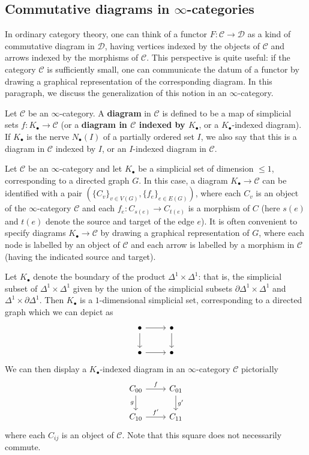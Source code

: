 \subsection{Commutative diagrams in \texorpdfstring{$\infty$}{inf}-categories}
In ordinary category theory, one can think of a functor $F:\mathcal{C}\to\mathcal{D}$ as a kind of commutative diagram in $\mathcal{D}$, having vertices indexed by the objects of $\mathcal{C}$ and arrows indexed by the morphisms of $\mathcal{C}$. This perspective is quite useful: if the category $\mathcal{C}$ is sufficiently small, one can communicate the datum of a functor by drawing a graphical representation of the corresponding diagram. In this paragraph, we discuss the generalization of this notion in an $\infty$-category.\par
Let $\mathcal{C}$ be an $\infty$-category. A \textbf{diagram} in $\mathcal{C}$ is defined to be a map of simplicial sets $f:K_\bullet\to\mathcal{C}$ (or a \textbf{diagram in $\mathcal{C}$ indexed by $K_\bullet$}, or a $K_\bullet$-indexed diagram). If $K_\bullet$ is the nerve $N_\bullet(I)$ of a partially ordered set $I$, we also say that this is a diagram in $\mathcal{C}$ indexed by $I$, or an $I$-indexed diagram in $\mathcal{C}$.
\begin{example}\label{simplicial set diagram indexed by graph}
Let $\mathcal{C}$ be an $\infty$-category and let $K_\bullet$ be a simplicial set of dimension $\leq 1$, corresponding to a directed graph $G$. In this case, a diagram $K_\bullet\to\mathcal{C}$ can be identified with a pair $(\{C_v\}_{v\in V(G)},\{f_e\}_{e\in E(G)})$, where each $C_v$ is an object of the $\infty$-category $\mathcal{C}$ and each $f_e:C_{s(e)}\to C_{t(e)}$ is a morphism of $C$ (here $s(e)$ and $t(e)$ denote the source and target of the edge $e$). It is often convenient to specify diagrams $K_\bullet\to\mathcal{C}$ by drawing a graphical representation of $G$, where each node is labelled by an object of $\mathcal{C}$ and each arrow is labelled by a morphism in $\mathcal{C}$ (having the indicated source and target).
\end{example}
\begin{example}\label{simplicial set non-commutative square in cat}
Let $K_\bullet$ denote the boundary of the product $\Delta^1\times\Delta^1$: that is, the simplicial subset of $\Delta^1\times\Delta^1$ given by the union of the simplicial subsets $\partial\Delta^1\times\Delta^1$ and $\Delta^1\times\partial\Delta^1$. Then $K_\bullet$ is a $1$-dimensional simplicial set, corresponding to a directed graph which we can depict as
\[\begin{tikzcd}
\bullet\ar[r]\ar[d]&\bullet\ar[d]\\
\bullet\ar[r]&\bullet
\end{tikzcd}\]
We can then display a $K_\bullet$-indexed diagram in an $\infty$-category $\mathcal{C}$ pictorially
\[\begin{tikzcd}
C_{00}\ar[d,swap,"g"]\ar[r,"f"]&C_{01}\ar[d,"g'"]\\
C_{10}\ar[r,"f'"]&C_{11}
\end{tikzcd}\]
where each $C_{ij}$ is an object of $\mathcal{C}$. Note that this square does not necessarily commute.
\end{example}

